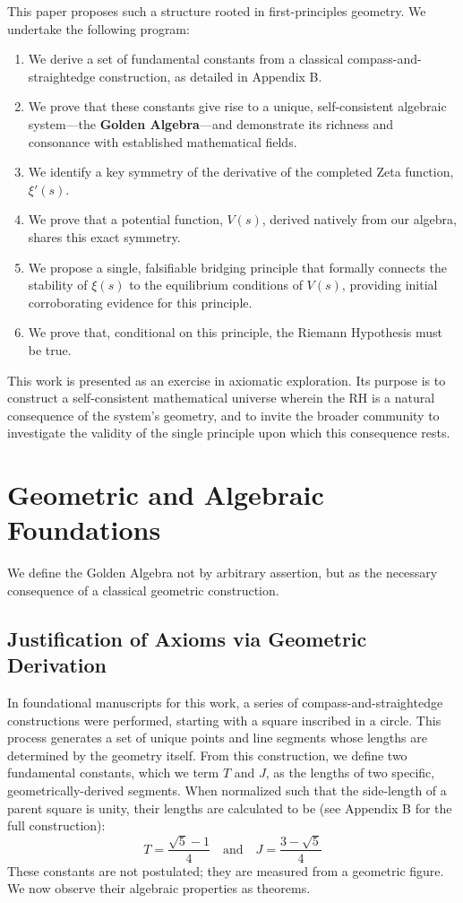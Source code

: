 \documentclass{article}
\theoremstyle{plain}
\theoremstyle{definition}
\theoremstyle{remark}
\begin{document}
This paper proposes such a structure rooted in first-principles geometry. We undertake the following program:
\begin{enumerate}
    \item We derive a set of fundamental constants from a classical compass-and-straightedge construction, as detailed in Appendix B.
    \item We prove that these constants give rise to a unique, self-consistent algebraic system—the \textbf{Golden Algebra}—and demonstrate its richness and consonance with established mathematical fields.
    \item We identify a key symmetry of the derivative of the completed Zeta function, $\xi'(s)$.
    \item We prove that a potential function, $V(s)$, derived natively from our algebra, shares this exact symmetry.
    \item We propose a single, falsifiable bridging principle that formally connects the stability of $\xi(s)$ to the equilibrium conditions of $V(s)$, providing initial corroborating evidence for this principle.
    \item We prove that, conditional on this principle, the Riemann Hypothesis must be true.
\end{enumerate}
This work is presented as an exercise in axiomatic exploration. Its purpose is to construct a self-consistent mathematical universe wherein the RH is a natural consequence of the system's geometry, and to invite the broader community to investigate the validity of the single principle upon which this consequence rests.

\section{Geometric and Algebraic Foundations}
We define the Golden Algebra not by arbitrary assertion, but as the necessary consequence of a classical geometric construction.

\subsection{Justification of Axioms via Geometric Derivation}
In foundational manuscripts for this work, a series of compass-and-straightedge constructions were performed, starting with a square inscribed in a circle. This process generates a set of unique points and line segments whose lengths are determined by the geometry itself. From this construction, we define two fundamental constants, which we term $T$ and $J$, as the lengths of two specific, geometrically-derived segments. When normalized such that the side-length of a parent square is unity, their lengths are calculated to be (see Appendix B for the full construction):
$$ T = \frac{\sqrt{5}-1}{4} \quad \text{and} \quad J = \frac{3-\sqrt{5}}{4} $$
These constants are not postulated; they are measured from a geometric figure. We now observe their algebraic properties as theorems.
\end{document}
